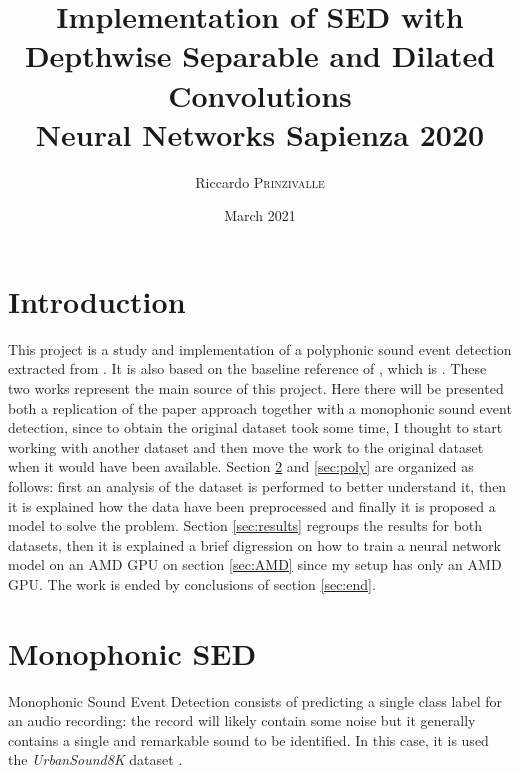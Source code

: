 \documentclass{article}
\title{Implementation of SED with Depthwise Separable and Dilated Convolutions \\[0.2em]\small{}Neural Networks Sapienza 2020} %
\author{Riccardo \textsc{Prinzivalle}} %
\date{March 2021} %
\begin{document}
\maketitle %



\section{Introduction}
\label{sec:intro}

This project is a study and implementation of a polyphonic sound event detection extracted from \cite{drossos2020sound}. It is also based on the baseline reference of \cite{drossos2020sound}, which is \cite{Cakir_2017}. These two works represent the main source of this project. Here there will be presented both a replication of the paper approach together with a monophonic sound event detection, since to obtain the original dataset took some time, I thought to start working with another dataset and then move the work to the original dataset when it would have been available. Section \ref{sec:mono} and \ref{sec:poly} are organized as follows: first an analysis of the dataset is performed to better understand it, then it is explained how the data have been preprocessed and finally it is proposed a model to solve the problem. Section \ref{sec:results} regroups the results for both datasets, then it is explained a brief digression on how to train a neural network model on an AMD GPU on section \ref{sec:AMD} since my setup has only an AMD GPU. The work is ended by conclusions of section \ref{sec:end}.
 

\section{Monophonic SED}
\label{sec:mono}

Monophonic Sound Event Detection consists of predicting a single class label for an audio recording: the record will likely contain some noise but it generally contains a single and remarkable sound to be identified. In this case, it is used the \textit{UrbanSound8K} dataset \cite{Salamon:UrbanSound:ACMMM:14}.
\end{document}
